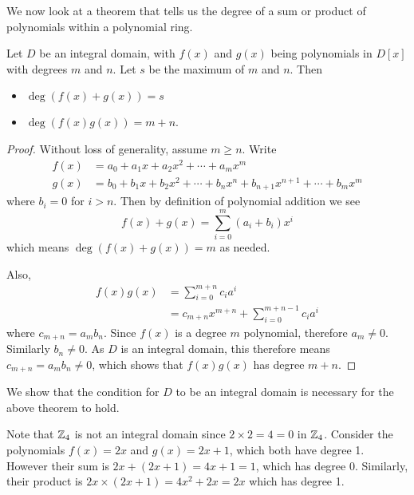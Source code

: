 We now look at a theorem that tells us the degree of a sum or product of polynomials within a polynomial ring.
\begin{theorem}\label{thrm-polynomial-degree-properties}
    Let $D$ be an integral domain, with $f(x)$ and $g(x)$ being polynomials in $D[x]$ with degrees $m$ and $n$. Let $s$ be the maximum of $m$ and $n$. Then
    \begin{itemize}
        \item $\deg(f(x) + g(x)) = s$
        \item $\deg(f(x)g(x)) = m + n$.
    \end{itemize}
\end{theorem}
\begin{proof}
    Without loss of generality, assume $m \geq n$. Write
    \begin{align*}
        f(x) &= a_0 + a_1x + a_2x^2 + \cdots + a_mx^m\\
        g(x) &= b_0 + b_1x + b_2x^2 + \cdots + b_nx^n + b_{n+1}x^{n+1} + \cdots + b_mx^m
    \end{align*}
    where $b_i = 0$ for $i > n$. Then by definition of polynomial addition we see
    \[
        f(x) + g(x) = \sum_{i=0}^m(a_i+b_i)x^i
    \]
    which means $\deg(f(x) + g(x)) = m$ as needed.

    Also,
    \begin{align*}
        f(x)g(x) &= \sum_{i=0}^{m+n}c_ia^i\\
        &= c_{m+n}x^{m+n} + \sum_{i=0}^{m+n-1}c_ia^i
    \end{align*}
    where $c_{m+n} = a_mb_n$. Since $f(x)$ is a degree $m$ polynomial, therefore $a_m \neq 0$. Similarly $b_n \neq 0$. As $D$ is an integral domain, this therefore means $c_{m+n} = a_mb_n \neq 0$, which shows that $f(x)g(x)$ has degree $m + n$.
\end{proof}
\begin{example}
    We show that the condition for $D$ to be an integral domain is necessary for the above theorem to hold.

    Note that $\mathbb{Z}_4$ is not an integral domain since $2 \times 2 = 4 = 0$ in $\mathbb{Z}_4$. Consider the polynomials $f(x) = 2x$ and $g(x) = 2x + 1$, which both have degree 1. However their sum is $2x + (2x + 1) = 4x + 1= 1$, which has degree 0. Similarly, their product is $2x \times (2x+1) = 4x^2 + 2x = 2x$ which has degree 1.
\end{example}

